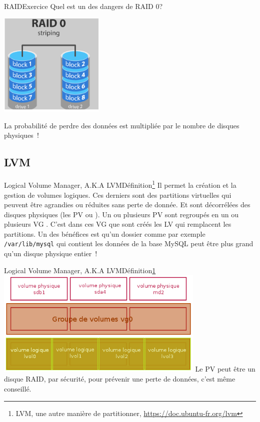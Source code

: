 \documentclass{beamer}
\begin{document}
    \begin{frame}{RAID}{Exercice \execcounterdispinc{}}
        Quel est un des dangers de RAID 0?
        \bigbreak
        \begin{center}
            \includegraphics[width=5cm]{image/raid-0}
        \end{center}
        \pause
        La probabilité de perdre des données est multipliée par le nombre de disques physiques~!
    \end{frame}

    \subsection{LVM}\label{subsec:lvm}

    \begin{frame}{Logical Volume Manager, A.K.A LVM}{Définition\footnote{\label{lvm}LVM, une autre manière de partitionner, \url{https://doc.ubuntu-fr.org/lvm}}}
        Il permet la création et la gestion de volumes logiques.
        Ces derniers sont des partitions virtuelles qui peuvent être agrandies ou réduites sans perte de donnée.
        Et sont décorrélées des disques physiques (les PV ou ).
        \bigbreak
        Un ou plusieurs PV sont regroupés en un ou plusieurs VG .
        \bigbreak
        C'est dans ces VG que sont créés les LV  qui remplacent les partitions.
        \bigbreak
        Un des bénéfices est qu'un dossier comme par exemple \lstinline{/var/lib/mysql} qui contient les données de la base MySQL peut être plus grand qu'un disque physique entier~!
    \end{frame}

    \begin{frame}{Logical Volume Manager, A.K.A LVM}{Définition\cref{lvm}}
        \centering
        \includegraphics[width=10cm]{image/lvm}
        \flushleft
        Le PV peut être un disque RAID, par sécurité, pour prévenir une perte de données, c'est même conseillé.
    \end{frame}
\end{document}

